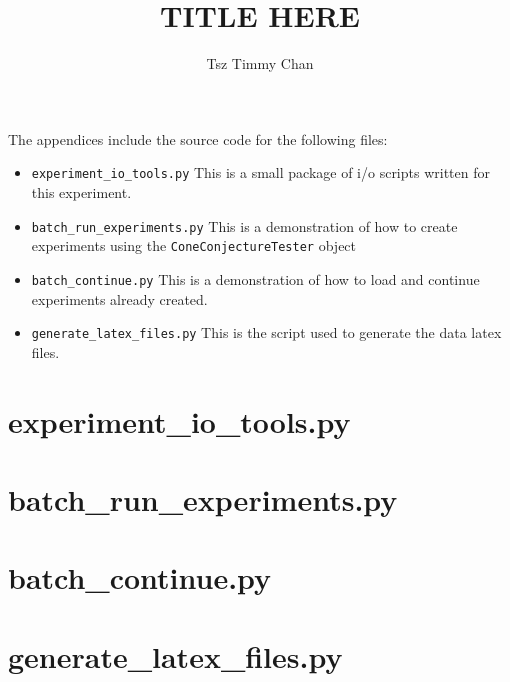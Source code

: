 \documentclass{TC}
\title{TITLE HERE}	%
\author{Tsz Timmy Chan}	%
\begin{document}
\begin{appendices}

The appendices include the source code for the following files:
\begin{itemize}
\item \texttt{experiment\_io\_tools.py} This is a small package of i/o scripts written for this experiment. 

\item \texttt{batch\_run\_experiments.py} This is a demonstration of how to create experiments using the \texttt{ConeConjectureTester} object

\item \texttt{batch\_continue.py} This is a demonstration of how to load and continue experiments already created.

\item \texttt{generate\_latex\_files.py} This is the script used to generate the data latex files.
\end{itemize}

\chapter{experiment\_io\_tools.py}


\chapter{batch\_run\_experiments.py}


\chapter{batch\_continue.py}


\chapter{generate\_latex\_files.py}

%


%


\end{appendices}
\end{document}

